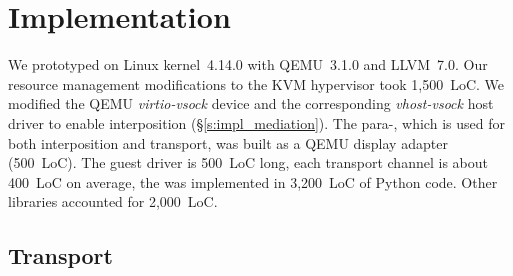 
\section{Implementation}
\label{s:impl}

We prototyped \model on Linux kernel~4.14.0 with QEMU~3.1.0 and LLVM~7.0.
Our resource management modifications to the KVM hypervisor took 1,500~LoC.
We modified the QEMU \emph{virtio-vsock} device and the corresponding \emph{vhost-vsock} host driver to enable interposition (\S\ref{s:impl_mediation}).
The para-\vdev, which is used for both interposition and transport, was built as a QEMU display adapter (500~LoC). The guest driver is 500~LoC long, each transport channel is about 400~LoC on average, the \compiler was implemented in 3,200~LoC of Python code. Other libraries accounted for 2,000~LoC.

\subsection{Transport}

